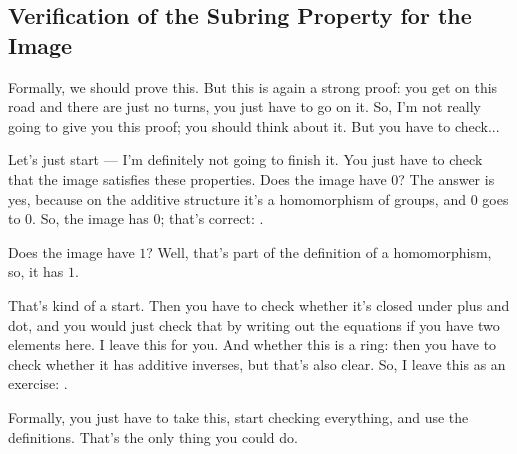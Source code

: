 \begin{content}

\end{content}

\subsection{Verification of the Subring Property for the Image}

\begin{speech}[00:38:20 - 00:39:53]
Formally, we should prove this. But this is again a strong proof: you get on this road and there are just no turns, you just have to go on it. So, I'm not really going to give you this proof; you should think about it. But you have to check... 

Let's just start --- I'm definitely not going to finish it. You just have to check that the image satisfies these properties. Does the image have $0$? The answer is yes, because on the additive structure it's a homomorphism of groups, and $0$ goes to $0$. So, the image has $0$; that's correct: .

Does the image have $1$?  Well, that's part of the definition of a homomorphism, so, it has $1$. 

That's kind of a start. Then you have to check whether it's closed under plus and dot, and you would just check that by writing out the equations if you have two elements here. I leave this for you. And whether this is a ring: then you have to check whether it has additive inverses, but that's also clear. So, I leave this as an exercise: .

Formally, you just have to take this, start checking everything, and use the definitions. That's the only thing you could do.
\end{speech}

